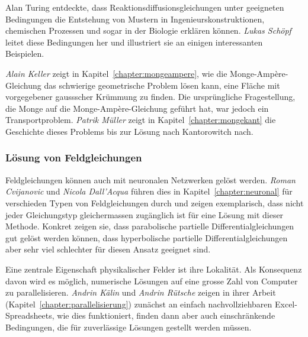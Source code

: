 %
%
Alan Turing
%
entdeckte, dass Reaktionsdiffusionsgleichungen unter geeigneten
Bedingungen die Entstehung von Mustern in Ingenieurskonstruktionen,
chemischen Prozessen und sogar in der Biologie erklären können.
\emph{Lukas Schöpf}
%
%
leitet diese Bedingungen her und illustriert sie an einigen interessanten
Beispielen.

%
%
\emph{Alain Keller}
%
%
zeigt in Kapitel~\ref{chapter:mongeampere}, wie die Monge-Ampère-Gleichung
%
das schwierige geometrische Problem lösen kann, eine Fläche mit vorgegebener
gaussscher Krümmung zu finden.
Die ursprüngliche Fragestellung, die Monge auf die Monge-Ampère-Gleichung
geführt hat, war jedoch ein Transportproblem.
%
\emph{Patrik Müller}
%
%
zeigt in Kapitel~\ref{chapter:mongekant} die Geschichte dieses Problems
bis zur Lösung nach Kantorowitch nach.
%

%
%
\subsubsection{Lösung von Feldgleichungen}

%
%
Feldgleichungen können auch mit neuronalen Netzwerken gelöst werden.
%
\emph{Roman Cvijanovic}
%
%
und
\emph{Nicola Dall'Acqua} 
%
%
führen dies in Kapitel~\ref{chapter:neuronal} für verschieden Typen
von Feldgleichungen durch und zeigen exemplarisch, dass nicht jeder
Gleichungstyp gleichermassen zugänglich ist für eine Lösung mit dieser
Methode. 
Konkret zeigen sie, dass parabolische partielle Differentialgleichungen
gut gelöst werden können, dass hyperbolische partielle Differentialgleichungen
aber sehr viel schlechter für diesen Ansatz geeignet sind.

%
%
Eine zentrale Eigenschaft physikalischer Felder ist ihre Lokalität.
%
Als Konsequenz davon wird es möglich, numerische Lösungen auf eine
grosse Zahl von Computer zu parallelisieren.
%
\emph{Andrin Kälin}
%
%
und
\emph{Andrin Rütsche}
%
%
zeigen in ihrer Arbeit (Kapitel~\ref{chapter:parallelisierung})
zunächst an einfach nachvollziehbaren Excel-Spreadsheets, wie dies
%
%
funktioniert, finden dann aber auch einschränkende Bedingungen,
die für zuverlässige Lösungen gestellt werden müssen.

